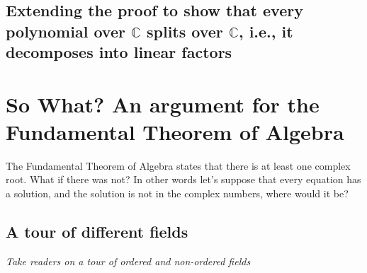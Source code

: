 \documentclass[12pt]{article}
\begin{document}
\subsection*{Extending the proof to show that every polynomial over $\mathbb{C}$ splits over $\mathbb{C}$, i.e., it decomposes into linear factors}








\section*{So What? An argument for the Fundamental Theorem of Algebra}  
The Fundamental Theorem of Algebra states that there is at least one complex root.  What if there was not?  In other words let's suppose that every equation has a solution, and the solution is not in the complex numbers, where would it be?
\subsection*{A tour of different fields}
\emph{Take readers on a tour of ordered and non-ordered fields}
\end{document}
